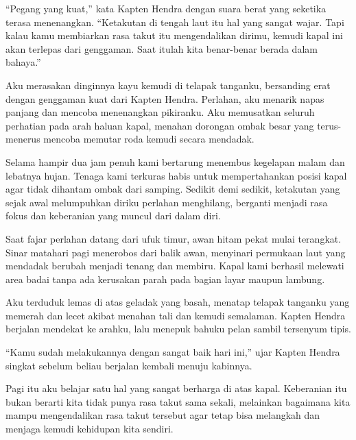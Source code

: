 ``Pegang yang kuat,'' kata Kapten Hendra dengan suara berat yang seketika terasa menenangkan. ``Ketakutan di tengah laut itu hal yang sangat wajar. Tapi kalau kamu membiarkan rasa takut itu mengendalikan dirimu, kemudi kapal ini akan terlepas dari genggaman. Saat itulah kita benar-benar berada dalam bahaya.''

Aku merasakan dinginnya kayu kemudi di telapak tanganku, bersanding erat dengan genggaman kuat dari Kapten Hendra. Perlahan, aku menarik napas panjang dan mencoba menenangkan pikiranku. Aku memusatkan seluruh perhatian pada arah haluan kapal, menahan dorongan ombak besar yang terus-menerus mencoba memutar roda kemudi secara mendadak.

Selama hampir dua jam penuh kami bertarung menembus kegelapan malam dan lebatnya hujan. Tenaga kami terkuras habis untuk mempertahankan posisi kapal agar tidak dihantam ombak dari samping. Sedikit demi sedikit, ketakutan yang sejak awal melumpuhkan diriku perlahan menghilang, berganti menjadi rasa fokus dan keberanian yang muncul dari dalam diri.

Saat fajar perlahan datang dari ufuk timur, awan hitam pekat mulai terangkat. Sinar matahari pagi menerobos dari balik awan, menyinari permukaan laut yang mendadak berubah menjadi tenang dan membiru. Kapal kami berhasil melewati area badai tanpa ada kerusakan parah pada bagian layar maupun lambung.

Aku terduduk lemas di atas geladak yang basah, menatap telapak tanganku yang memerah dan lecet akibat menahan tali dan kemudi semalaman. Kapten Hendra berjalan mendekat ke arahku, lalu menepuk bahuku pelan sambil tersenyum tipis.

``Kamu sudah melakukannya dengan sangat baik hari ini,'' ujar Kapten Hendra singkat sebelum beliau berjalan kembali menuju kabinnya.

Pagi itu aku belajar satu hal yang sangat berharga di atas kapal. Keberanian itu bukan berarti kita tidak punya rasa takut sama sekali, melainkan bagaimana kita mampu mengendalikan rasa takut tersebut agar tetap bisa melangkah dan menjaga kemudi kehidupan kita sendiri.

\jedahias
